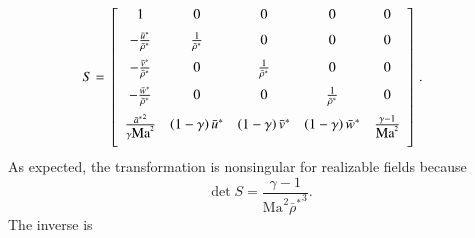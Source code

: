 \documentclass[letterpaper,11pt,nointlimits,reqno,draft]{amsart}
\newcommand{\Mach}[1][]{\ensuremath{\mbox{Ma}_{#1}}}
\begin{document}
\begin{align}
S &= \left[\begin{array}{ccccc}
    1      %
  & 0      %
  & 0      %
  & 0      %
  & 0      %
  \\ \noalign{\medskip}
    - \frac{\bar{u}^*}{\bar{\rho}^*} %
  & \frac{1}{\bar{\rho}^*}           %
  & 0                                %
  & 0                                %
  & 0                                %
  \\ \noalign{\medskip}
    - \frac{\bar{v}^*}{\bar{\rho}^*} %
  & 0                                %
  & \frac{1}{\bar{\rho}^*}           %
  & 0                                %
  & 0                                %
  \\ \noalign{\medskip}
    - \frac{\bar{w}^*}{\bar{\rho}^*} %
  & 0                                %
  & 0                                %
  & \frac{1}{\bar{\rho}^*}           %
  & 0                                %
  \\ \noalign{\medskip}
    \frac{{\bar{a}^*}^2}{\gamma\Mach^2} %
  & \left(1 - \gamma\right) \bar{u}^*   %
  & \left(1 - \gamma\right) \bar{v}^*   %
  & \left(1 - \gamma\right) \bar{w}^*   %
  & \frac{\gamma-1}{\Mach^2}            %
  \\ \noalign{\medskip}
\end{array}\right]
.
\end{align}
As expected, the transformation is nonsingular for realizable fields because
\[
  \det S = \frac{\gamma-1}{\Mach^2 {\bar{\rho}^{*}}^3}.
\]
The inverse is
\end{document}
